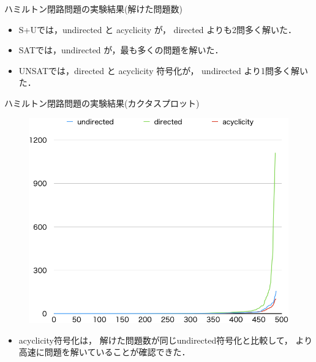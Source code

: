 \documentclass[dvipdfmx,11pt]{beamer}
\begin{document}
\begin{frame}{ハミルトン閉路問題の実験結果(解けた問題数)}

\begin{itemize}
\item \textsf{S+U}では，\textsf{undirected} と \textsf{acyclicity} が，
  \textsf{directed} よりも2問多く解いた．
\item \textsf{SAT}では，\textsf{undirected} が，最も多くの問題を解いた．
\item \textsf{UNSAT}では，\textsf{directed} と \textsf{acyclicity} 符号化が，
  \textsf{undirected} より1問多く解いた．
\end{itemize}
\end{frame}

\begin{frame}{ハミルトン閉路問題の実験結果(カクタスプロット)}
\begin{figure}[tb]
\begin{center}
  \includegraphics[width=0.7\linewidth]{fig/cactus.png}
\label{cactus}
\end{center}
\end{figure}

\begin{itemize}
\item \textsf{acyclicity}符号化は，
  解けた問題数が同じ\textsf{undirected}符号化と比較して，
  より高速に問題を解いていることが確認できた．
\end{itemize}
\end{frame}
\end{document}
